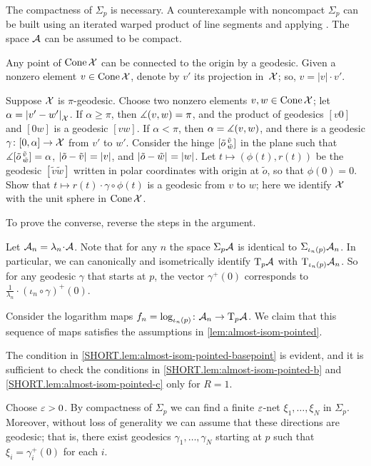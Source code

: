 The compactness of $\Sigma_p$ is necessary.
A counterexample with noncompact $\Sigma_p$ can be built using an iterated warped product of line segments and applying \cite[Theorem 1.2]{alexander-bishop2004}.
The space $\mathcal{A}$ can be assumed to be compact.


Any point of $\mathop{\rm Cone}\nolimits \mathcal{X}$ can be connected to the origin by a geodesic.
Given a nonzero element $v\in\mathop{\rm Cone}\nolimits \mathcal{X}$, denote by $v'$ its projection in~$\mathcal{X}$; so, $v=|v|\cdot v'$.

Suppose $\mathcal{X}$ is $\pi$-geodesic.
Choose two nonzero elements $v,w\z\in\Cone \spc{X}$; let $\alpha=\dist{v'}{w'}{\spc{X}}$.
If $\alpha\ge \pi$, then $\measuredangle(v,w)=\pi$, and the product of geodesics $[v0]$ and $[0w]$ is a geodesic $[vw]$.
If $\alpha<\pi$, then $\alpha=\measuredangle(v,w)$, and there is a geodesic $\gamma\colon[0,\alpha]\to \mathcal{X}$ from $v'$ to $w'$.
Consider the hinge $[\tilde o\,{}^{\tilde v}_{\tilde w}]$ in the plane
such that $\measuredangle[\tilde o\,{}^{\tilde v}_{\tilde w}]=\alpha$, $\dist{\tilde o}{\tilde v}{}=|v|$, and $\dist{\tilde o}{\tilde w}{}=|w|$.
Let $t\mapsto (\phi(t),r(t))$ be the geodesic $[\tilde v\tilde w]$ written in polar coordinates with origin at $\tilde o$, so that $\phi(0)=0$.
Show that $t\mapsto r(t)\cdot\gamma\circ\phi(t)$ is a geodesic from $v$ to $w$;
here we identify $\mathcal{X}$ with the unit sphere in $\mathop{\rm Cone}\nolimits \mathcal{X}$.

To prove the converse, reverse the steps in the argument.

Let $\spc{A}_n=\lambda_n\cdot\spc{A}$.
Note that for any $n$ the space $\Sigma_p\mathcal{A}$ is identical to $\Sigma_{\iota_n(p)} \mathcal{A}_n$.
In particular, we can canonically and isometrically identify $\mathrm{T}_p\mathcal{A}$ with $\mathrm{T}_{\iota_n(p)}\mathcal{A}_n$.
So for any geodesic $\gamma$ that starts at $p$, the vector $\gamma^+(0)$ corresponds to $\frac{1}{\lambda_n}\cdot(\iota_n\circ\gamma)^+(0)$.

Consider the logarithm maps $f_n=\log_{\iota_n(p)}\colon\mathcal{A}_n\to \mathrm{T}_p\mathcal{A}$.
We claim that this sequence of maps satisfies the assumptions in \ref{lem:almost-isom-pointed}.

The condition in \ref{SHORT.lem:almost-isom-pointed-basepoint} is evident, and it is sufficient to check the conditions in \ref{SHORT.lem:almost-isom-pointed-b} and \ref{SHORT.lem:almost-isom-pointed-c} only for $R=1$.

Choose $\varepsilon>0$.
By compactness of $\Sigma_p$ we can find a finite $\varepsilon$-net $\xi_1,\dots,\xi_N$ in $\Sigma_p$. Moreover, without loss of generality we can assume that these directions are geodesic;
that is, there exist geodesics $\gamma_1,\ldots, \gamma_N$ starting at $p$ such that $\xi_i=\gamma_i^+(0)$ for each $i$.

